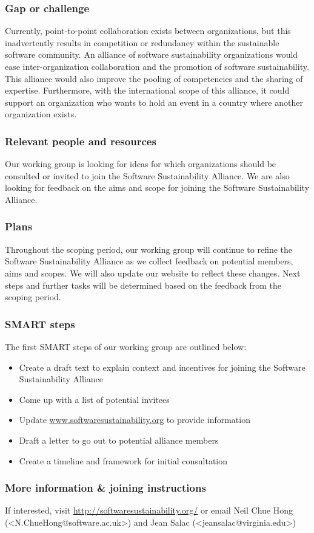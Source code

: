 \subsubsection{Gap or challenge}

Currently, point-to-point collaboration exists between organizations, but this inadvertently results in competition or redundancy within the sustainable software community. An alliance of software sustainability organizations would ease inter-organization collaboration and the promotion of software sustainability. This alliance would also improve the pooling of competencies and the sharing of expertise. Furthermore, with the international scope of this alliance, it could support an organization who wants to hold an event in a country where another organization exists.

\subsubsection{Relevant people and resources}

Our working group is looking for ideas for which organizations should be consulted or invited to join the Software Sustainability Alliance. We are also looking for feedback on the aims and scope for joining the Software Sustainability Alliance.

\subsubsection{Plans}

Throughout the scoping period, our working group will continue to refine the Software Sustainability Alliance as we collect feedback on potential members, aims and scopes. We will also update our website to reflect these changes. Next steps and further tasks will be determined based on the feedback from the scoping period.

\subsubsection{SMART steps}

The first SMART steps of our working group are outlined below:
\begin{itemize}
\item Create a draft text to explain context and incentives for joining the Software Sustainability Alliance
\item Come up with a list of potential invitees
\item Update \url{www.softwaresustainability.org} to provide information
\item Draft a letter to go out to potential alliance members
\item Create a timeline and framework for initial consultation
\end{itemize}

\subsubsection{More information \& joining instructions}

If interested, visit \url{http://softwaresustainability.org/} or email Neil Chue Hong (<N.ChueHong@software.ac.uk>) and Jean Salac (<jeansalac@virginia.edu>)
